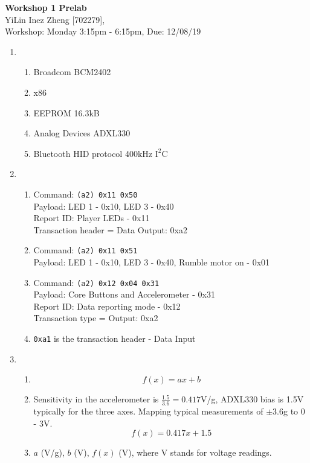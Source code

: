 \documentclass[11pt]{article}
\begin{document}
\begin{center}
\textbf{\Large{Workshop 1 Prelab}}\\
YiLin Inez Zheng [702279], \\
Workshop: Monday 3:15pm - 6:15pm, Due: 12/08/19  
\end{center}

\begin{enumerate}
    \item %
    \begin{enumerate}
        \item %
        Broadcom BCM2402
        \item %
        x86
        \item %
        EEPROM 16.3kB
        \item %
        Analog Devices ADXL330
        \item %
        Bluetooth HID protocol 400kHz $\text{I}^2$C
    \end{enumerate}
    \item %
    \begin{enumerate}
        \item %
        Command: \texttt{(a2) 0x11 0x50}\\
        Payload: LED 1 - 0x10, LED 3 - 0x40\\
        Report ID: Player LEDs - 0x11\\
        Transaction header = Data Output: 0xa2
        \item %
        Command: \texttt{(a2) 0x11 0x51}\\
        Payload: LED 1 - 0x10, LED 3 - 0x40, Rumble motor on - 0x01
        \item %
        Command: \texttt{(a2) 0x12 0x04 0x31}\\
        Payload: Core Buttons and Accelerometer - 0x31\\
        Report ID: Data reporting mode - 0x12\\
        Transaction type = Output: 0xa2
        \item %
        \texttt{0xa1} is the transaction header - Data Input
    \end{enumerate}
    \item %
    \begin{enumerate}
        \item %
        \begin{equation*}
            f(x) = ax + b
        \end{equation*}
        \item %
        Sensitivity in the accelerometer is $\frac{1.5}{3.6} = 0.417$V/g, ADXL330 bias is 1.5V typically for the three axes.
        Mapping typical measurements of $\pm3.6$g to 0 - 3V.  
        \begin{equation*}
            f(x) = 0.417x + 1.5
        \end{equation*}
        \item %
        $a$ (V/g), $b$ (V), $f(x)$ (V), where V stands for voltage readings.
    \end{enumerate}
\end{enumerate}
\end{document}

